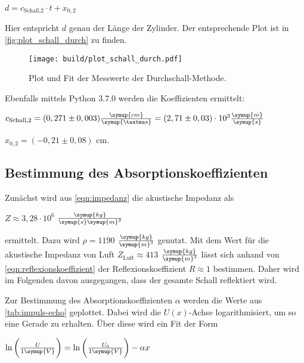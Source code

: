 \begin{center}
    $d = c_\text{Schall,2} \cdot t + x_{0,2}$
\end{center}

Hier entspricht $d$ genau der Länge der Zylinder. Der entsprechende Plot ist in \autoref{fig:plot_schall_durch} zu finden.

\begin{figure}
    \centering
    \texttt{[image: build/plot\_schall\_durch.pdf]}
    \caption{Plot und Fit der Messwerte der Durchschall-Methode.}
    \label{fig:plot_schall_durch}
\end{figure}

Ebenfalls mittels Python 3.7.0 werden die Koeffizienten ermittelt:

\begin{center}
    $c_\text{Schall,2} = (0,271 \pm 0,003) \frac{\symup{cm}}{\symup{µs}} = (2,71 \pm 0,03) \cdot 10^{3} \frac{\symup{m}}{\symup{s}}$
    
    $x_{0,2} = (-0,21 \pm 0,08)$ cm.
\end{center}


\subsection{Bestimmung des Absorptionskoeffizienten}

Zunächst wird aus \eqref{eqn:impedanz} die akustische Impedanz als

\begin{center}
    $Z \approx 3,28 \cdot 10^{6}$ $\frac{\symup{kg}}{\symup{s}\symup{m}^2}$
\end{center}

ermittelt. Dazu wird $\rho = 1190$ $\frac{\symup{kg}}{\symup{m}^3}$ \cite{pmma} genutzt. 
Mit dem Wert für die akustische Impedanz von Luft $Z_\text{Luft} \approx 413$ $\frac{\symup{kg}}{\symup{m}^3}$\cite{akImLuft} lässt sich anhand von \eqref{eqn:reflexionskoeffizient} der Reflexionskoeffizient $R \approx 1$ bestimmen.
Daher wird im Folgenden davon ausgegangen, dass der gesamte Schall reflektiert wird.

Zur Bestimmung des Absorptionskoeffizienten $\alpha$ werden die Werte aus \autoref{tab:impuls-echo} geplottet.
Dabei wird die $U(x)$-Achse logarithmisiert, um so eine Gerade zu erhalten.
Über diese wird ein Fit der Form

\begin{center}
    $\ln \bigg( \frac{U}{1 \symup{V}} \bigg) = \ln \bigg( \frac{U_0}{1 \symup{V}} \bigg) - \alpha x$
\end{center}

